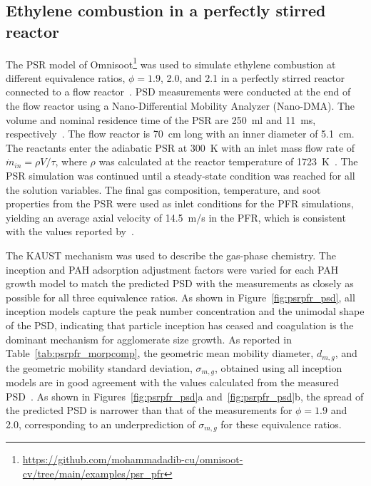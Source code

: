 \subsection{Ethylene combustion in a perfectly stirred reactor}
The PSR model of Omnisoot\footnote{\href{https://github.com/mohammadadib-cu/omnisoot-cv/tree/main/examples/psr_pfr}{https://github.com/mohammadadib-cu/omnisoot-cv/tree/main/examples/psr\_pfr}} was used to simulate ethylene combustion at different equivalence ratios, $\phi = 1.9$, 2.0, and 2.1 in a perfectly stirred reactor connected to a flow reactor~\citep{manzello2007soot}. PSD measurements were conducted at the end of the flow reactor using a Nano-Differential Mobility Analyzer (Nano-DMA). The volume and nominal residence time of the PSR are 250~ml and 11~ms, respectively~\citep{manzello2007soot}. The flow reactor is 70~cm long with an inner diameter of 5.1~cm. The reactants enter the adiabatic PSR at 300~K with an inlet mass flow rate of $\dot{m}_{in} = \rho V / \tau$, where $\rho$ was calculated at the reactor temperature of 1723~K~\citep{lenhert2009effects}. The PSR simulation was continued until a steady-state condition was reached for all the solution variables. The final gas composition, temperature, and soot properties from the PSR were used as inlet conditions for the PFR simulations, yielding an average axial velocity of 14.5~m/s in the PFR, which is consistent with the values reported by~\citet{manzello2007soot}.

The KAUST mechanism was used to describe the gas-phase chemistry. The inception and PAH adsorption adjustment factors were varied for each PAH growth model to match the predicted PSD with the measurements as closely as possible for all three equivalence ratios. As shown in Figure~\ref{fig:psrpfr_psd}, all inception models capture the peak number concentration and the unimodal shape of the PSD, indicating that particle inception has ceased and coagulation is the dominant mechanism for agglomerate size growth. As reported in Table~\ref{tab:psrpfr_morpcomp}, the geometric mean mobility diameter, $d_{m,g}$, and the geometric mobility standard deviation, $\sigma_{m,g}$, obtained using all inception models are in good agreement with the values calculated from the measured PSD~\citep{manzello2007soot}. As shown in Figures~\ref{fig:psrpfr_psd}a and~\ref{fig:psrpfr_psd}b, the spread of the predicted PSD is narrower than that of the measurements for $\phi = 1.9$ and 2.0, corresponding to an underprediction of $\sigma_{m,g}$ for these equivalence ratios.



